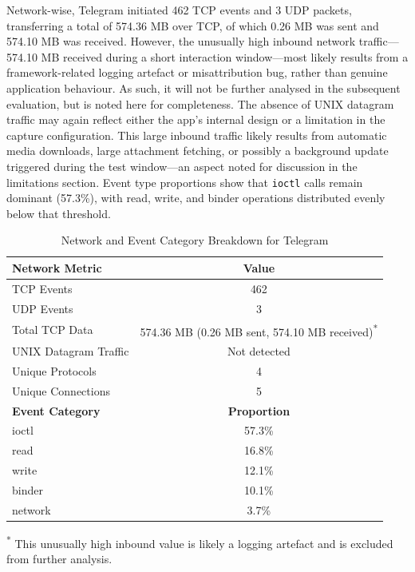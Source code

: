 \documentclass[a4paper,12pt]{report}
\begin{document}
Network-wise, Telegram initiated 462 TCP events and 3 UDP packets, transferring a total of 574.36 MB over TCP, of which 0.26 MB was sent and 574.10 MB was received. However, the unusually high inbound network traffic—574.10 MB received during a short interaction window—most likely results from a framework-related logging artefact or misattribution bug, rather than genuine application behaviour. As such, it will not be further analysed in the subsequent evaluation, but is noted here for completeness.
The absence of UNIX datagram traffic may again reflect either the app’s internal design or a limitation in the capture configuration. This large inbound traffic likely results from automatic media downloads, large attachment fetching, or possibly a background update triggered during the test window—an aspect noted for discussion in the limitations section. Event type proportions show that \texttt{ioctl} calls remain dominant (57.3\%), with read, write, and binder operations distributed evenly below that threshold.

\begin{table}[H]
    \centering
    \caption{Network and Event Category Breakdown for Telegram}
    \label{tab:telegram_network_category}
    \begin{tabular}{|l|c|}
        \hline
        \textbf{Network Metric} & \textbf{Value} \\
        \hline
        TCP Events & 462 \\
        UDP Events & 3 \\
        Total TCP Data & 574.36 MB (0.26 MB sent, 574.10 MB received)\textsuperscript{*} \\
        UNIX Datagram Traffic & Not detected \\
        Unique Protocols & 4 \\
        Unique Connections & 5 \\
        \hline
        \textbf{Event Category} & \textbf{Proportion} \\
        \hline
        ioctl & 57.3\% \\
        read & 16.8\% \\
        write & 12.1\% \\
        binder & 10.1\% \\
        network & 3.7\% \\
        \hline
    \end{tabular}
\begin{flushleft}
\scriptsize\textsuperscript{*} This unusually high inbound value is likely a logging artefact and is excluded from further analysis.
\end{flushleft}
\end{table}
\end{document}
